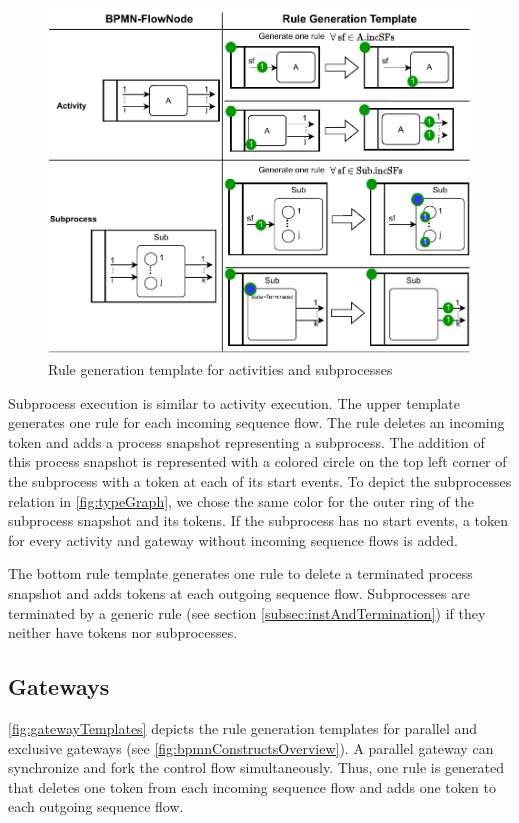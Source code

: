 \documentclass[runningheads]{llncs}
\begin{document}
\begin{figure}[ht]
    \centering
    \includegraphics[width=1\textwidth]{images/activities_template.pdf}
    \caption{Rule generation template for activities and subprocesses}
    \label{fig:activityTemplates}
\end{figure}

Subprocess execution is similar to activity execution.
The upper template generates one rule for each incoming sequence flow.
The rule deletes an incoming token and adds a process snapshot representing a subprocess. 
The addition of this process snapshot is represented with a colored circle on the top left corner of the subprocess with a token at each of its start events.
To depict the \textsf{subprocesses} relation in \autoref{fig:typeGraph}, we chose the same color for the outer ring of the subprocess snapshot and its tokens.
If the subprocess has no start events, a token for every activity and gateway without incoming sequence flows is added. %

The bottom rule template generates one rule to delete a terminated process snapshot and adds tokens at each outgoing sequence flow.
Subprocesses are terminated by a generic rule (see section \ref{subsec:instAndTermination}) if they neither have tokens nor subprocesses.


\subsection{Gateways}
\autoref{fig:gatewayTemplates} depicts the rule generation templates for parallel and exclusive gateways (see \autoref{fig:bpmnConstructsOverview}).
A parallel gateway can synchronize and fork the control flow simultaneously.
Thus, one rule is generated that deletes one token from each incoming sequence flow and adds one token to each outgoing sequence flow.
\end{document}
